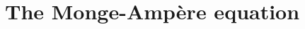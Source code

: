 \documentclass[12pt,a4paper]{book}
\newcommand{\DD}{{\rm I\!D}}
\newcommand{\calB}{{\cal B}}
\newcommand{\calL}{{\cal L}}
\begin{document}

\section{The Monge-Amp\`ere equation}
\label{equation}
\label{monge-ampere}

\end{document}
